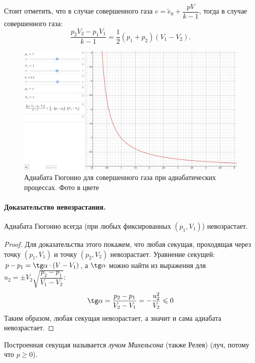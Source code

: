 Стоит отметить, что в случае совершенного газа $e = \tilde e_0 + \dfrac{pV}{k-1}$,
тогда в случае совершенного газа:
\[
  \dfrac{p_2V_2 - p_1V_1}{k-1} = \dfrac{1}{2} (p_1+p_2) (V_1 - V_2).
\]
\begin{figure}[H]
  \centering
  \includegraphics[width=0.9\linewidth]{img/Gugonio_adiabata_desmos.png}
  \caption{Адиабата Гюгонио для совершенного газа при адиабатических процессах. Фото в цвете}
\end{figure}

\paragraph{Доказательство невозрастания.}
Адиабата Гюгонио всегда (при любых фиксированных $(p_1, V_1)$) невозрастает. 
\begin{proof}
  Для доказательства этого покажем, что любая секущая, проходящая через
  точку $(p_1, V_1)$ и точку $(p_2, V_2)$ невозрастает.
  Уравнение секущей: $p - p_1 = \tg \alpha \cdot (V - V_1)$, 
  а $\tg \alpha$ можно найти из выражения для $u_2 = \pm V_2 \sqrt{\dfrac{p_2-p_1}{V_1 - V_2}}$:
  \[
    \tg \alpha  = \dfrac{p_2 - p_1}{V_2 - V_1} = - \dfrac{u_2^2}{V_2} \leqslant 0
  \]
  Таким образом, любая секущая невозрастает, а значит и сама адиабата невозрастает.
\end{proof}

Построенная секущая называется \emph{лучом Михельсона} (также Релея) (луч, потому что $p \geqslant 0$).

